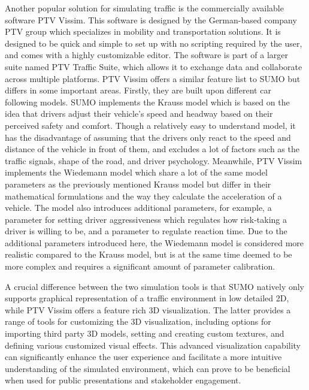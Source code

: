         Another popular solution for simulating traffic is the commercially available software PTV Vissim. This software is designed by the German-based company PTV group which specializes in mobility and transportation solutions. It is designed to be quick and simple to set up with no scripting required by the user, and comes with a highly customizable editor. The software is part of a larger suite named PTV Traffic Suite, which allows it to exchange data and collaborate across multiple platforms. PTV Vissim offers a similar feature list to SUMO but differs in some important areas. Firstly, they are built upon different car following models. SUMO implements the Krauss model which is based on the idea that drivers adjust their vehicle’s speed and headway based on their perceived safety and comfort. Though a relatively easy to understand model, it has the disadvantage of assuming that the drivers only react to the speed and distance of the vehicle in front of them, and excludes a lot of factors such as the traffic signals, shape of the road, and driver psychology. Meanwhile, PTV Vissim implements the Wiedemann model\cite{ahmed2021} which share a lot of the same model parameters as the previously mentioned Krauss model but differ in their mathematical formulations and the way they calculate the acceleration of a vehicle. The model also introduces additional parameters, for example, a parameter for setting driver aggressiveness which regulates how risk-taking a driver is willing to be, and a parameter to regulate reaction time. Due to the additional parameters introduced here, the Wiedemann model is considered more realistic compared to the Krauss model, but is at the same time deemed to be more complex and requires a significant amount of parameter calibration.

        A crucial difference between the two simulation tools is that SUMO natively only supports graphical representation of a traffic environment in low detailed 2D, while PTV Vissim offers a feature rich 3D visualization. The latter provides a range of tools for customizing the 3D visualization, including options for importing third party 3D models, setting and creating custom textures, and defining various customized visual effects. This advanced visualization capability can significantly enhance the user experience and facilitate a more intuitive understanding of the simulated environment, which can prove to be beneficial when used for public presentations and stakeholder engagement. 
